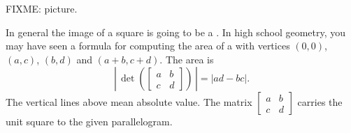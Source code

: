 FIXME: picture.

In general the image of a square is going to be a .
In high school geometry, you may have seen a formula for
computing the area of a 
with vertices $(0,0)$, $(a,c)$, $(b,d)$
and $(a+b,c+d)$.  The area is
\begin{equation*}
\left\lvert \, \det \left(
\begin{bmatrix} a & b \\ c & d \end{bmatrix}
\right) \, \right\lvert
=
\lvert
a d - b c
\rvert
.
\end{equation*}
The vertical lines above mean absolute value.
The matrix $\left[ \begin{smallmatrix} a & b \\ c & d \end{smallmatrix}
\right]$
carries the unit square to the given parallelogram.

\medskip

